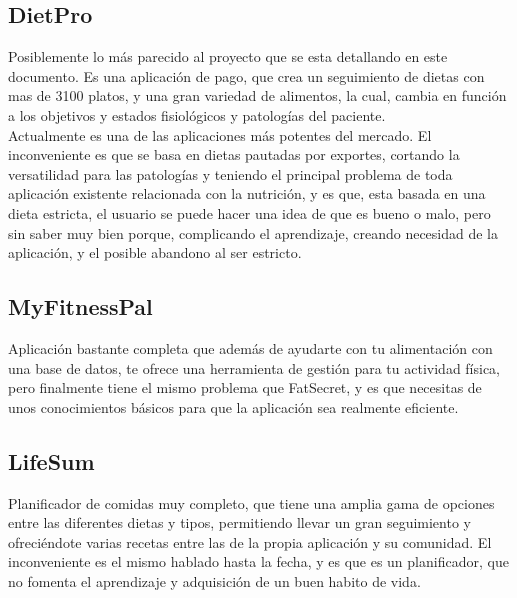 \subsection{DietPro}
Posiblemente lo más parecido al proyecto que se esta detallando en este documento. Es una aplicación de pago, que crea un seguimiento de dietas con mas de 3100 platos, y una gran variedad de alimentos, la cual, cambia en función a los objetivos y estados fisiológicos y patologías del paciente.\\
Actualmente es una de las aplicaciones más potentes del mercado. El inconveniente es que se basa en dietas pautadas por exportes, cortando la versatilidad para las patologías y teniendo el principal problema de toda aplicación existente relacionada con la nutrición, y es que, esta basada en una dieta estricta, el usuario se puede hacer una idea de que es bueno o malo, pero sin saber muy bien porque, complicando el aprendizaje, creando necesidad de la aplicación, y el posible abandono al ser estricto.\\
\subsection{MyFitnessPal}
Aplicación bastante completa que además de ayudarte con tu alimentación con una base de datos, te ofrece una herramienta de gestión para tu actividad física, pero finalmente tiene el mismo problema que FatSecret, y es que necesitas de unos conocimientos básicos para que la aplicación sea realmente eficiente.\\
\subsection{LifeSum}
Planificador de comidas muy completo, que tiene una amplia gama de opciones entre las diferentes dietas y tipos, permitiendo llevar un gran seguimiento y ofreciéndote varias recetas entre las de la propia aplicación y su comunidad. El inconveniente es el mismo hablado hasta la fecha, y es que es un planificador, que no fomenta el aprendizaje y adquisición de un buen habito de vida. 
	
